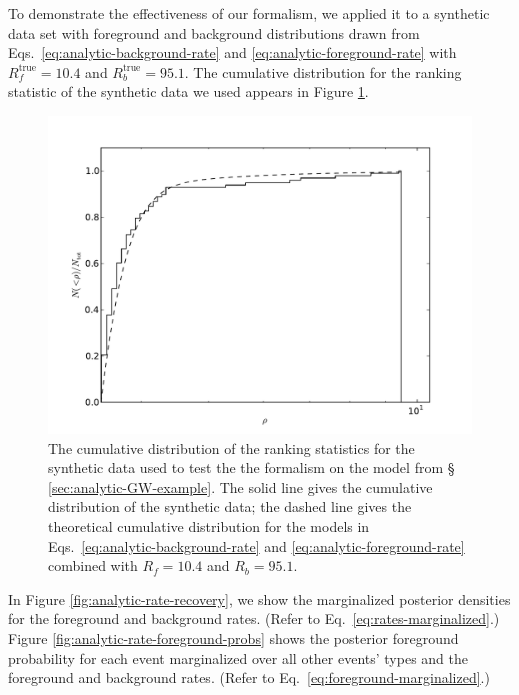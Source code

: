 \documentclass[aps,prd,reprint]{revtex4-1}
\begin{document}
To demonstrate the effectiveness of our formalism, we applied it to a
synthetic data set with foreground and background distributions drawn
from Eqs.~\eqref{eq:analytic-background-rate} and
\eqref{eq:analytic-foreground-rate} with $R_f^\mathrm{true} = 10.4$
and $R_b^\mathrm{true} = 95.1$.  The cumulative distribution for the
ranking statistic of the synthetic data we used appears in Figure
\ref{fig:analytic-data-cumulative}.

\begin{figure}
  \includegraphics[width=\columnwidth]{data}
  \caption{\label{fig:analytic-data-cumulative} The cumulative
    distribution of the ranking statistics for the synthetic data used
    to test the the formalism on the model from \S
    \ref{sec:analytic-GW-example}.  The solid line gives the
    cumulative distribution of the synthetic data; the dashed line
    gives the theoretical cumulative distribution for the models in
    Eqs.~\eqref{eq:analytic-background-rate} and
    \eqref{eq:analytic-foreground-rate} combined with $R_f = 10.4$ and
    $R_b = 95.1$.}
\end{figure}

In Figure \ref{fig:analytic-rate-recovery}, we show the marginalized
posterior densities for the foreground and background rates.  (Refer
to Eq.~\eqref{eq:rates-marginalized}.)  Figure
\ref{fig:analytic-rate-foreground-probs} shows the posterior
foreground probability for each event marginalized over all other
events' types and the foreground and background rates.  (Refer to
Eq.~\eqref{eq:foreground-marginalized}.)
\end{document}
